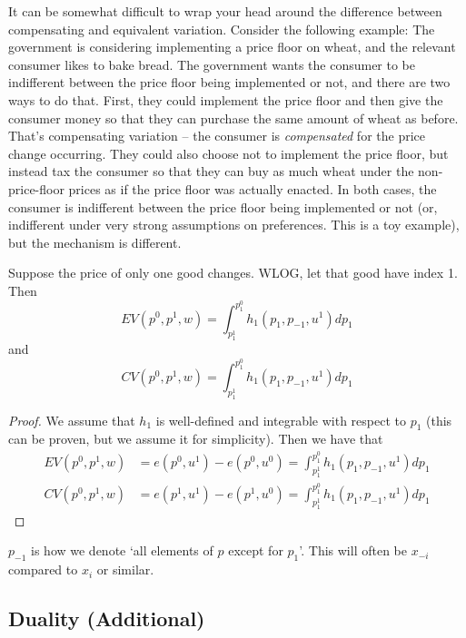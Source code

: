 \documentclass[12pt]{article}
\begin{document}
\begin{remark}
	It can be somewhat difficult to wrap your head around the difference between compensating and equivalent variation. Consider the following example: The government is considering implementing a price floor on wheat, and the relevant consumer likes to bake bread. The government wants the consumer to be indifferent between the price floor being implemented or not, and there are two ways to do that. First, they could implement the price floor and then give the consumer money so that they can purchase the same amount of wheat as before. That's compensating variation -- the consumer is \emph{compensated} for the price change occurring. They could also choose not to implement the price floor, but instead tax the consumer so that they can buy as much wheat under the non-price-floor prices as if the price floor was actually enacted. In both cases, the consumer is indifferent between the price floor being implemented or not (or, indifferent under very strong assumptions on preferences. This is a toy example), but the mechanism is different.
\end{remark}

\begin{proposition}\label{prop:ev_cv}
	Suppose the price of only one good changes. WLOG, let that good have index 1. Then
	\[
	EV(p^0,p^1,w) = \int_{p_1^1}^{p_1^0} h_1(p_1,p_{-1},u^1)dp_1
	\]
	and
	\[
	CV(p^0,p^1,w) = \int_{p_1^1}^{p_1^0} h_1(p_1,p_{-1},u^1)dp_1
	\]
\end{proposition}
\begin{proof}
	We assume that $h_1$ is well-defined and integrable with respect to $p_1$ (this can be proven, but we assume it for simplicity). Then we have that
	\begin{align*}
		EV(p^0,p^1,w) &= e(p^0,u^1) - e(p^0,u^0) = \int_{p_1^1}^{p_1^0} h_1(p_1,p_{-1},u^1)dp_1 \\
		CV(p^0,p^1,w) &= e(p^1,u^1) - e(p^1,u^0) = \int_{p_1^1}^{p_1^0} h_1(p_1,p_{-1},u^1)dp_1
	\end{align*}
\end{proof}

\begin{remark}
	$p_{-1}$ is how we denote `all elements of $p$ except for $p_1$'. This will often be $x_{-i}$ compared to $x_i$ or similar.
\end{remark}


\subsection{Duality (Additional)}
\end{document}
